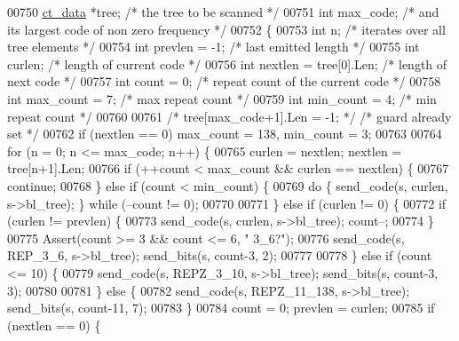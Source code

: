 \begin{DoxyCode}
{{{{{{{{{{{{{00750     \hyperlink{structct__data__s}{ct\_data} *tree; \textcolor{comment}{/* the tree to be scanned */}
00751     \textcolor{keywordtype}{int} max\_code;       \textcolor{comment}{/* and its largest code of non zero frequency */}
00752 \{
00753     \textcolor{keywordtype}{int} n;                     \textcolor{comment}{/* iterates over all tree elements */}
00754     \textcolor{keywordtype}{int} prevlen = -1;          \textcolor{comment}{/* last emitted length */}
00755     \textcolor{keywordtype}{int} curlen;                \textcolor{comment}{/* length of current code */}
00756     \textcolor{keywordtype}{int} nextlen = tree[0].Len; \textcolor{comment}{/* length of next code */}
00757     \textcolor{keywordtype}{int} count = 0;             \textcolor{comment}{/* repeat count of the current code */}
00758     \textcolor{keywordtype}{int} max\_count = 7;         \textcolor{comment}{/* max repeat count */}
00759     \textcolor{keywordtype}{int} min\_count = 4;         \textcolor{comment}{/* min repeat count */}
00760 
00761     \textcolor{comment}{/* tree[max\_code+1].Len = -1; */}  \textcolor{comment}{/* guard already set */}
00762     \textcolor{keywordflow}{if} (nextlen == 0) max\_count = 138, min\_count = 3;
00763 
00764     \textcolor{keywordflow}{for} (n = 0; n <= max\_code; n++) \{
00765         curlen = nextlen; nextlen = tree[n+1].Len;
00766         \textcolor{keywordflow}{if} (++count < max\_count && curlen == nextlen) \{
00767             \textcolor{keywordflow}{continue};
00768         \} \textcolor{keywordflow}{else} \textcolor{keywordflow}{if} (count < min\_count) \{
00769             \textcolor{keywordflow}{do} \{ send\_code(s, curlen, s->bl\_tree); \} \textcolor{keywordflow}{while} (--count != 0);
00770 
00771         \} \textcolor{keywordflow}{else} \textcolor{keywordflow}{if} (curlen != 0) \{
00772             \textcolor{keywordflow}{if} (curlen != prevlen) \{
00773                 send\_code(s, curlen, s->bl\_tree); count--;
00774             \}
00775             Assert(count >= 3 && count <= 6, \textcolor{stringliteral}{" 3\_6?"});
00776             send\_code(s, REP\_3\_6, s->bl\_tree); send\_bits(s, count-3, 2);
00777 
00778         \} \textcolor{keywordflow}{else} \textcolor{keywordflow}{if} (count <= 10) \{
00779             send\_code(s, REPZ\_3\_10, s->bl\_tree); send\_bits(s, count-3, 3);
00780 
00781         \} \textcolor{keywordflow}{else} \{
00782             send\_code(s, REPZ\_11\_138, s->bl\_tree); send\_bits(s, count-11, 7);
00783         \}
00784         count = 0; prevlen = curlen;
00785         \textcolor{keywordflow}{if} (nextlen == 0) \{
}}}}}}}}}}}}}
\end{DoxyCode}
